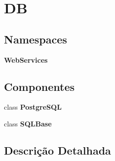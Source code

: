 \section{DB}
\label{group___d_b}
\subsection*{Namespaces}
\begin{DoxyCompactItemize}
\item 
 {\bf Web\+Services}
\end{DoxyCompactItemize}
\subsection*{Componentes}
\begin{DoxyCompactItemize}
\item 
class {\bf Postgre\+S\+QL}
\item 
class {\bf S\+Q\+L\+Base}
\end{DoxyCompactItemize}


\subsection{Descrição Detalhada}
